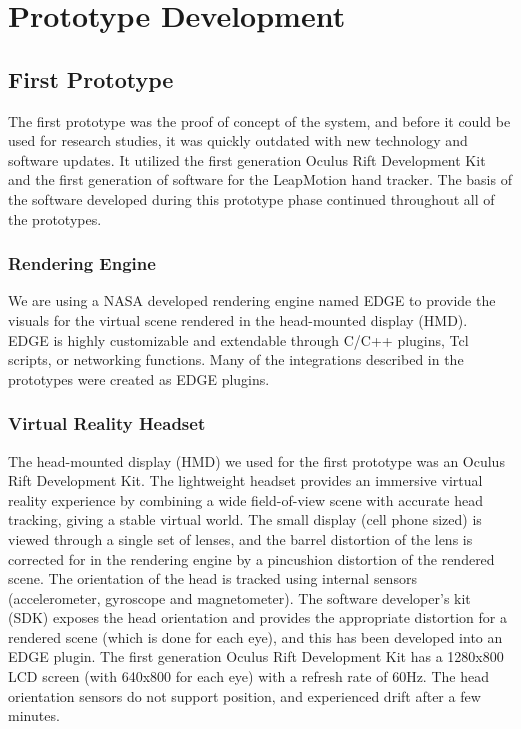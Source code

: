 \section{Prototype Development}

\subsection{First Prototype}

The first prototype was the proof of concept of the system, and before it could be used for research studies, it was quickly outdated with new technology and software updates.
It utilized the first generation Oculus Rift Development Kit and the first generation of software for the LeapMotion hand tracker.
The basis of the software developed during this prototype phase continued throughout all of the prototypes.

\subsubsection{Rendering Engine}

We are using a NASA developed rendering engine named EDGE to provide the visuals for the virtual scene rendered in the head-mounted display (HMD).
EDGE is highly customizable and extendable through C/C++ plugins, Tcl scripts, or networking functions.
Many of the integrations described in the prototypes were created as EDGE plugins.

\subsubsection{Virtual Reality Headset}

The head-mounted display (HMD) we used for the first prototype was an Oculus Rift Development Kit.
The lightweight headset provides an immersive virtual reality experience by combining a wide field-of-view scene with accurate head tracking, giving a stable virtual world.
The small display (cell phone sized) is viewed through a single set of lenses, and the barrel distortion of the lens is corrected for in the rendering engine by a pincushion distortion of the rendered scene.
The orientation of the head is tracked using internal sensors (accelerometer, gyroscope and magnetometer).
The software developer’s kit (SDK) exposes the head orientation and provides the appropriate distortion for a rendered scene (which is done for each eye), and this has been developed into an EDGE plugin.
The first generation Oculus Rift Development Kit has a 1280x800 LCD screen (with 640x800 for each eye) with a refresh rate of 60Hz.
The head orientation sensors do not support position, and experienced drift after a few minutes.

